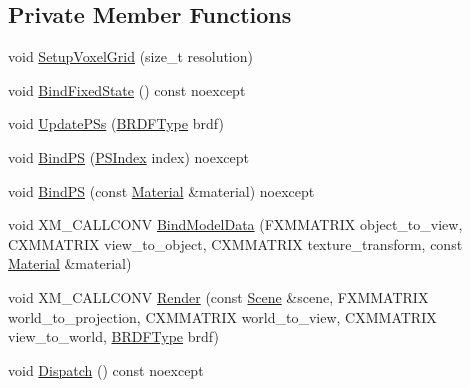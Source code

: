\subsection*{Private Member Functions}
\begin{DoxyCompactItemize}
\item 
void \hyperlink{classmage_1_1_voxelization_pass_aa2dd428dfdcd9d4d03d8bcc16c10c8f8}{Setup\+Voxel\+Grid} (size\+\_\+t resolution)
\item 
void \hyperlink{classmage_1_1_voxelization_pass_ae91349cb63c302c256c822cfd69c42e8}{Bind\+Fixed\+State} () const noexcept
\item 
void \hyperlink{classmage_1_1_voxelization_pass_a573f27eb1c6fdb5701ee0ccf3cbef91c}{Update\+P\+Ss} (\hyperlink{namespacemage_af1044f87544bc38427766a8c795d2f26}{B\+R\+D\+F\+Type} brdf)
\item 
void \hyperlink{classmage_1_1_voxelization_pass_a73bd22aa706e59e7d270875ff631ac4c}{Bind\+PS} (\hyperlink{classmage_1_1_voxelization_pass_a3632bab7b0039dbbe10569618ae57589}{P\+S\+Index} index) noexcept
\item 
void \hyperlink{classmage_1_1_voxelization_pass_a4dce943e59020690124a2db73004d135}{Bind\+PS} (const \hyperlink{classmage_1_1_material}{Material} \&material) noexcept
\item 
void X\+M\+\_\+\+C\+A\+L\+L\+C\+O\+NV \hyperlink{classmage_1_1_voxelization_pass_a7c49d59653daa9a205b13de23727b3d6}{Bind\+Model\+Data} (F\+X\+M\+M\+A\+T\+R\+IX object\+\_\+to\+\_\+view, C\+X\+M\+M\+A\+T\+R\+IX view\+\_\+to\+\_\+object, C\+X\+M\+M\+A\+T\+R\+IX texture\+\_\+transform, const \hyperlink{classmage_1_1_material}{Material} \&material)
\item 
void X\+M\+\_\+\+C\+A\+L\+L\+C\+O\+NV \hyperlink{classmage_1_1_voxelization_pass_a1ea0c61ba9cac129b9c655ea7ef557d5}{Render} (const \hyperlink{classmage_1_1_scene}{Scene} \&scene, F\+X\+M\+M\+A\+T\+R\+IX world\+\_\+to\+\_\+projection, C\+X\+M\+M\+A\+T\+R\+IX world\+\_\+to\+\_\+view, C\+X\+M\+M\+A\+T\+R\+IX view\+\_\+to\+\_\+world, \hyperlink{namespacemage_af1044f87544bc38427766a8c795d2f26}{B\+R\+D\+F\+Type} brdf)
\item 
void \hyperlink{classmage_1_1_voxelization_pass_ada3b9ac5f11073929db725c762bb48da}{Dispatch} () const noexcept
\end{DoxyCompactItemize}

